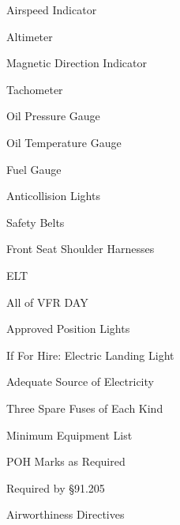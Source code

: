 \documentclass{article}
\begin{document}
  \begin{multicols*}{2}


    \begin{notelist}
      \item Airspeed Indicator
      \item Altimeter
      \item Magnetic Direction Indicator
      \item Tachometer
      \item Oil Pressure Gauge
      \item Oil Temperature Gauge
      \item Fuel Gauge
      \item Anticollision Lights
      \item Safety Belts
      \item Front Seat Shoulder Harnesses
      \item ELT
    \end{notelist}


    \begin{notelist}
      \item All of VFR DAY
      \item Approved Position Lights
      \item If For Hire: Electric Landing Light
      \item Adequate Source of Electricity
      \item Three Spare Fuses of Each Kind
    \end{notelist}



    \begin{notelist}
      \item Minimum Equipment List
    \end{notelist}


    \begin{notelist}
      \item POH Marks as Required
      \item Required by \S 91.205
      \item Airworthiness Directives
    \end{notelist}


\end{multicols*}
\end{document}
